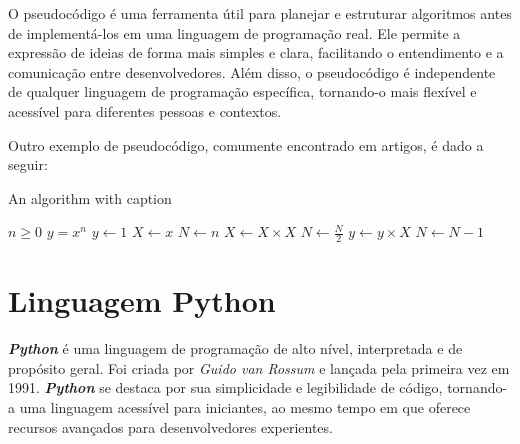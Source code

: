 \documentclass[a4paper, 12pt, onecolumn,singlespacing]{article}
\begin{document}
	O pseudocódigo é uma ferramenta útil para planejar e estruturar algoritmos antes de implementá-los em uma linguagem de programação real. Ele permite a expressão de ideias de forma mais simples e clara, facilitando o entendimento e a comunicação entre desenvolvedores. Além disso, o pseudocódigo é independente de qualquer linguagem de programação específica, tornando-o mais flexível e acessível para diferentes pessoas e contextos.
	
	Outro exemplo de pseudocódigo, comumente encontrado em artigos, é dado a seguir:
		
	\begin{algorithm}
		\caption{An algorithm with caption}\label{alg:cap}
		\begin{algorithmic}
			\Require $n \geq 0$
			\Ensure $y = x^n$
			\State $y \gets 1$
			\State $X \gets x$
			\State $N \gets n$
			\State $X \gets X \times X$
			\State $N \gets \frac{N}{2}$  
			\State $y \gets y \times X$
			\State $N \gets N - 1$
			\EndIf
			\EndWhile
		\end{algorithmic}
	\end{algorithm}
	
	
	\section{Linguagem Python}
	
	\textbf{\textit{Python}} é uma linguagem de programação de alto nível, interpretada e de propósito geral. Foi criada por \textit{Guido van Rossum} e lançada pela primeira vez em 1991. \textbf{\textit{Python}} se destaca por sua simplicidade e legibilidade de código, tornando-a uma linguagem acessível para iniciantes, ao mesmo tempo em que oferece recursos avançados para desenvolvedores experientes.
	
\end{document}
